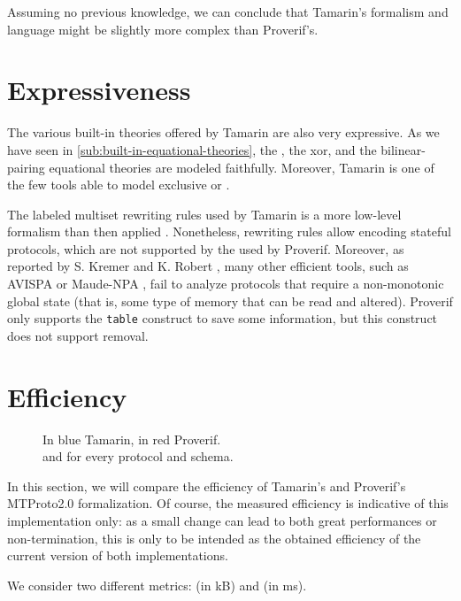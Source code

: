 Assuming no previous knowledge, we can conclude that Tamarin's formalism and language might be slightly more complex than Proverif's.

\section{Expressiveness}
The various built-in theories offered by Tamarin are also very expressive. As we have seen in \cref{sub:built-in-equational-theories}, the \DiHe{}, the xor, and the bilinear-pairing equational theories are modeled faithfully. Moreover, Tamarin is one of the few tools able to model exclusive or \cite{xor_tamarin}.

\lstset{language=proverif}
The labeled multiset rewriting rules used by Tamarin is a more low-level formalism than then applied \pic{}. Nonetheless, rewriting rules allow encoding stateful protocols, which are not supported by the \Horncs{} used by Proverif. Moreover, as reported by S. Kremer and K. Robert \cite{kremer:hal-00955869}, many other efficient tools, such as AVISPA \cite{10.1007/11513988_27} or Maude-NPA \cite{Escobar2009}, fail to analyze protocols that require a non-monotonic global state (that is, some type of memory that can be read and altered). Proverif only supports the \lstinline{table} construct to save some information, but this construct does not support removal.

\section{Efficiency}
\begin{figure}
    \centering
    \hfill
    \caption{In blue Tamarin, in red Proverif.\\\Wct{} and \mrss{} for every protocol and schema.}
    \label{fig:efficiency}
\end{figure}
In this section, we will compare the efficiency of Tamarin's and Proverif's MTProto2.0 formalization. Of course, the measured efficiency is indicative of this implementation only: as a small change can lead to both great performances or non-termination, this is only to be intended as the obtained efficiency of the current version of both implementations.

We consider two different metrics: \textit{\mrss{}} (in kB) and \textit{\wct{}} (in ms).

